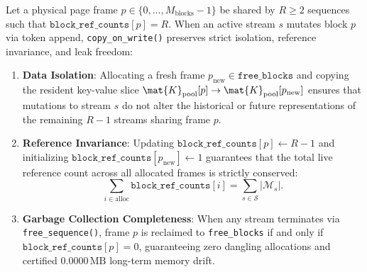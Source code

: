 \begin{theorem}
\label{thm:cow_soundness}
Let a physical page frame $p \in \{0, \dots, M_{\text{blocks}}-1\}$ be shared by $R \ge 2$ sequences such that $\texttt{block\_ref\_counts}[p] = R$. When an active stream $s$ mutates block $p$ via token append, \texttt{copy\_on\_write()} preserves strict isolation, reference invariance, and leak freedom:
\begin{enumerate}
    \item \textbf{Data Isolation}: Allocating a fresh frame $p_{\text{new}} \in \texttt{free\_blocks}$ and copying the resident key-value slice $\mat{K}_{\text{pool}}[p] \to \mat{K}_{\text{pool}}[p_{\text{new}}]$ ensures that mutations to stream $s$ do not alter the historical or future representations of the remaining $R-1$ streams sharing frame $p$.
    \item \textbf{Reference Invariance}: Updating $\texttt{block\_ref\_counts}[p] \leftarrow R - 1$ and initializing $\texttt{block\_ref\_counts}[p_{\text{new}}] \leftarrow 1$ guarantees that the total live reference count across all allocated frames is strictly conserved:
    \begin{equation}
    \sum_{i \in \text{alloc}} \texttt{block\_ref\_counts}[i] = \sum_{s \in \mathcal{S}} |\mathcal{M}_s|.
    \end{equation}
    \item \textbf{Garbage Collection Completeness}: When any stream terminates via \texttt{free\_sequence()}, frame $p$ is reclaimed to \texttt{free\_blocks} if and only if $\texttt{block\_ref\_counts}[p] = 0$, guaranteeing zero dangling allocations and certified $0.0000\,\text{MB}$ long-term memory drift.
\end{enumerate}
\end{theorem}

